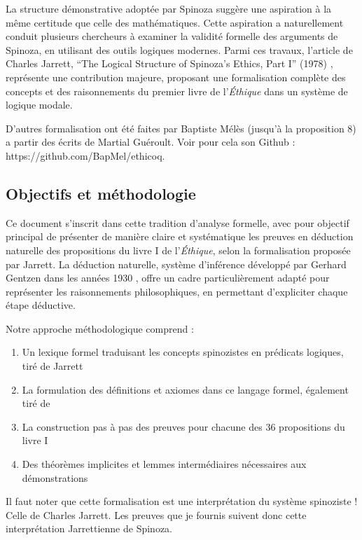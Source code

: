 \documentclass[10pt,a3paper]{article}
\begin{document}
La structure démonstrative adoptée par Spinoza suggère une aspiration à la même certitude que celle des mathématiques. Cette aspiration a naturellement conduit plusieurs chercheurs à examiner la validité formelle des arguments de Spinoza, en utilisant des outils logiques modernes. Parmi ces travaux, l'article de Charles Jarrett, ``The Logical Structure of Spinoza's Ethics, Part I'' (1978) \cite{jarrett1978logical}, représente une contribution majeure, proposant une formalisation complète des concepts et des raisonnements du premier livre de l'\textit{Éthique} dans un système de logique modale.

D'autres formalisation ont été faites par Baptiste Mélès (jusqu'à la proposition 8) a partir des écrits de Martial Guéroult. Voir pour cela son Github : https://github.com/BapMel/ethicoq.

\subsection{Objectifs et méthodologie}

Ce document s'inscrit dans cette tradition d'analyse formelle, avec pour objectif principal de présenter de manière claire et systématique les preuves en déduction naturelle des propositions du livre I de l'\textit{Éthique}, selon la formalisation proposée par Jarrett. La déduction naturelle, système d'inférence développé par Gerhard Gentzen dans les années 1930 \cite{gentzen1969investigations}, offre un cadre particulièrement adapté pour représenter les raisonnements philosophiques, en permettant d'expliciter chaque étape déductive.

Notre approche méthodologique comprend :

\begin{enumerate}
    \item Un lexique formel traduisant les concepts spinozistes en prédicats logiques, tiré de Jarrett \cite{jarrett1978logical}
    \item La formulation des définitions et axiomes dans ce langage formel, également tiré de \cite{jarrett1978logical}
    \item La construction pas à pas des preuves pour chacune des 36 propositions du livre I
    \item Des théorèmes implicites et lemmes intermédiaires nécessaires aux démonstrations
\end{enumerate}

Il faut noter que cette formalisation est une interprétation du système spinoziste ! Celle de Charles Jarrett. Les preuves que je fournis suivent donc cette interprétation Jarrettienne de Spinoza.
\end{document}
